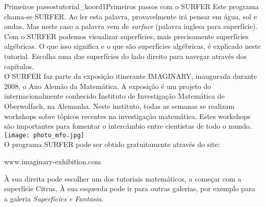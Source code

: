 \begin{surferIntroPage}{Primeiros passos}{tutorial_koord1}{Primeiros passos com o SURFER}
Este programa chama-se SURFER. Ao ler esta palavra, provavelmente ir\'a pensar em \'agua, sol e ondas. Mas neste caso a palavra vem de {\it surface} (palavra inglesa para superf\'icie).
\\
Com o SURFER podemos visualizar  superf\'icies, mais precisamente superf\'icies alg\'ebricas. O que isso significa e o que s\~ao superf\'icies alg\'ebricas, \'e explicado neste tutorial. Escolha uma das superf\'icies do lado direito para navegar atrav\'es dos cap\'itulos.\\
O SURFER faz parte da exposi\c c\~ao itinerante IMAGINARY, inaugurada durante 2008, o  Ano Alem\~ao da Matem\'atica. A exposi\c c\~ao \'e um projeto do internacionalmente conhecido Instituto de Investiga\c c\~ao Matem\' atica de Oberwolfach, na Alemanha. Neste instituto, todas as semanas se realizam  workshops sobre t\'opicos recentes na investiga\c c\~ao matem\'atica. Estes workshops s\~ao importantes para fomentar o interc\^ambio entre cientistas de todo o mundo. \\
\vspace{0.2cm} \hspace{3.5cm}\texttt{[image: photo\_mfo.jpg]}\\
O programa SURFER pode ser obtido gratuitamente atrav\'es do site: \\
\begin{centering}
www.imaginary-exhibition.com\\
\end{centering}
 \vspace{0.2cm}
\`A sua direita pode escolher um dos tutoriais matem\'aticos, a come\c car com a superf\'icie Citrus. \`A sua esquerda pode ir para outras galerias, por exemplo para a galeria  {\it Superf\'icies e Fantasia}.
\end{surferIntroPage}
